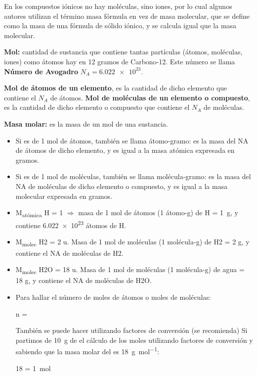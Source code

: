 En los compuestos iónicos no hay moléculas, sino iones, por lo cual algunos autores utilizan el término masa fórmula en vez de masa molecular, que se define como la masa de una fórmula de sólido iónico, y se calcula igual que la masa molecular.

\textbf{Mol:} cantidad de sustancia que contiene tantas partículas (átomos, moléculas, iones) como átomos hay en 12 gramos de Carbono-12.
Este número se llama \textbf{Número de Avogadro} \( N_A = \num{6.022e23} \).

\textbf{Mol de átomos de un elemento}, es la cantidad de dicho elemento que contiene el \( N_A \) de átomos.
\textbf{Mol de moléculas de un elemento o compuesto}, es la cantidad de dicho elemento o compuesto que contiene el \( N_A \) de moléculas.

\textbf{Masa molar:} es la masa de un mol de una sustancia.
\begin{itemize}
    \item Si es de 1 mol de átomos, también se llama átomo-gramo: es la masa del NA de átomos de dicho elemento, y es igual a la masa atómica expresada en gramos.
    \item Si es de 1 mol de moléculas, también se llama molécula-gramo: es la masa del NA de moléculas de dicho elemento o compuesto, y es igual a la masa molecular expresada en gramos.
\end{itemize}


\begin{itemize}
    \item M\textsubscript{atómica} H = \qty{1}{\uma} \( \Rightarrow \) masa de 1 mol de átomos (1 átomo-g) de H = \qty{1}{\g}, y contiene \num{6.022e23} átomos de H.
    \item M\textsubscript{molec} H2 = 2 u. Masa de 1 mol de moléculas (1 molécula-g) de H2 = 2 g, y contiene el NA de moléculas de H2.
    \item M\textsubscript{molec} H2O = 18 u. Masa de 1 mol de moléculas (1 molécula-g) de agua = 18 g, y contiene el NA de moléculas de H2O.
    \item Para hallar el número de moles de átomos o moles de moléculas:
    \begin{centeredequation}
        n = 
    \end{centeredequation}
    También se puede hacer utilizando factores de conversión (se recomienda)
    Si partimos de \qty{10}{\g} de  el cálculo de los moles utilizando factores de conversión y sabiendo que la masa molar del  es \qty{18}{\g\per\mol}:
    \begin{centeredequation}
        18 \cancelred{\unit{\g}} \cdot {} = \qty{1}{\mol}
    \end{centeredequation}
\end{itemize}


